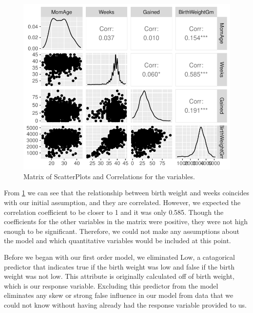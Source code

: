 \documentclass{article}\usepackage[]{graphicx}\usepackage[]{xcolor}
\makeatletter
\def\maxwidth{ %
  \ifdim\Gin@nat@width>\linewidth
    \linewidth
  \else
    \Gin@nat@width
  \fi
}
\newenvironment{knitrout}{}{} %
\makeatother
\begin{document}
\begin{enumerate}[a.]
\begin{figure}[H]
\centering
\begin{knitrout}
\color{fgcolor}
\includegraphics[width=\maxwidth]{figure/unnamed-chunk-7-1} 
\end{knitrout}
\caption{Matrix of ScatterPlots and Correlations for the variables.}
\label{CorrelationSummary}
\end{figure}

From \ref{CorrelationSummary} we can see that the relationship between birth weight and weeks coincides with our initial assumption, and they are correlated. However, we expected the correlation coefficient to be closer to 1 and it was only 0.585. Though the coefficients for the other variables in the matrix were positive, they were not high enough to be significant. Therefore, we could not make any assumptions about the model and which quantitative variables would be included at this point.

\end{enumerate}

Before we began with our first order model, we eliminated Low, a catagorical predictor that indicates true if the birth weight was low and false if the birth weight was not low. This attribute is originally calculated off of birth weight, which is our response variable. Excluding this predictor from the model eliminates any skew or strong false influence in our model from data that we could not know without having already had the response variable provided to us.
\end{document}

